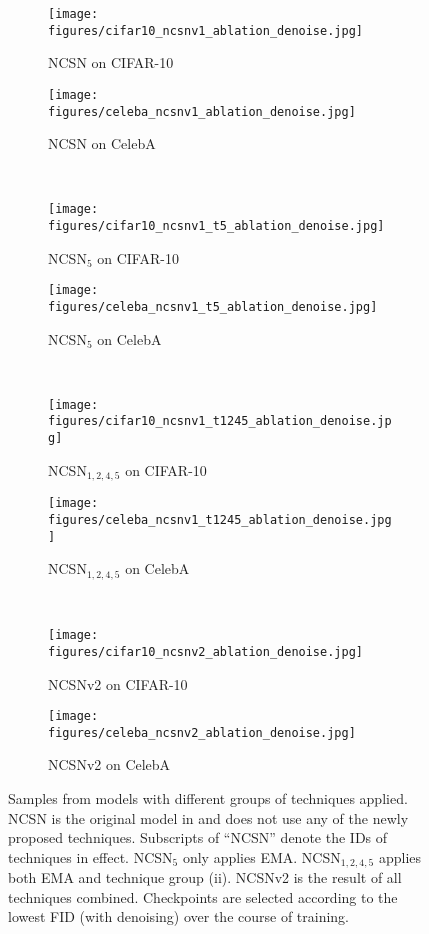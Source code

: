 \documentclass{article}
\begin{document}
\begin{figure}[H]
    \centering
    \begin{subfigure}{0.49\textwidth}
        \texttt{[image: figures/cifar10\_ncsnv1\_ablation\_denoise.jpg]}
        \caption{NCSN on CIFAR-10}
    \end{subfigure}
    \begin{subfigure}{0.49\textwidth}
        \texttt{[image: figures/celeba\_ncsnv1\_ablation\_denoise.jpg]}
        \caption{NCSN on CelebA}
    \end{subfigure}\\
    \begin{subfigure}{0.49\textwidth}
        \texttt{[image: figures/cifar10\_ncsnv1\_t5\_ablation\_denoise.jpg]}
        \caption{NCSN$_5$ on CIFAR-10}
    \end{subfigure}
    \begin{subfigure}{0.49\textwidth}
        \texttt{[image: figures/celeba\_ncsnv1\_t5\_ablation\_denoise.jpg]}
        \caption{NCSN$_5$ on CelebA}
    \end{subfigure}\\
    \begin{subfigure}{0.49\textwidth}
        \texttt{[image: figures/cifar10\_ncsnv1\_t1245\_ablation\_denoise.jpg]}
        \caption{NCSN$_{1,2,4,5}$ on CIFAR-10}
    \end{subfigure}
    \begin{subfigure}{0.49\textwidth}
        \texttt{[image: figures/celeba\_ncsnv1\_t1245\_ablation\_denoise.jpg]}
        \caption{NCSN$_{1,2,4,5}$ on CelebA}
    \end{subfigure}\\
    \begin{subfigure}{0.49\textwidth}
        \texttt{[image: figures/cifar10\_ncsnv2\_ablation\_denoise.jpg]}
        \caption{NCSNv2 on CIFAR-10}
    \end{subfigure}
    \begin{subfigure}{0.49\textwidth}
        \texttt{[image: figures/celeba\_ncsnv2\_ablation\_denoise.jpg]}
        \caption{NCSNv2 on CelebA}
    \end{subfigure}
    \caption{Samples from models with different groups of techniques applied. NCSN is the original model in \cite{song2019generative} and does not use any of the newly proposed techniques. Subscripts of ``NCSN'' denote the IDs of techniques in effect. NCSN$_5$ only applies EMA. NCSN$_{1,2,4,5}$ applies both EMA and technique group (ii). NCSNv2 is the result of all techniques combined. Checkpoints are selected according to the lowest FID (with denoising) over the course of training.}
    \label{fig:ablation_samples}
\end{figure}
\end{document}
